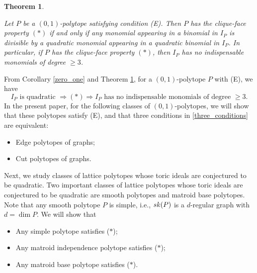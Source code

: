 \documentclass[10pt,a4paper]{amsart}
\newtheorem{thm}{Theorem} [section]
\numberwithin{thm}{section}
\numberwithin{equation}{section}
\begin{document}
\begin{thm}\label{indispensable}

Let \(P\) be a \((0,1)\)-polytope satisfying condition (E).
Then \(P\) has the clique-face property \((*)\) if and only if
any monomial appearing in a binomial in \(I_P\) is divisible by
a quadratic monomial appearing in a quadratic binomial in \(I_P\).
In particular, if \(P\) has the clique-face property \((*)\), then
\(I_P\) has no indispensable monomials of degree \(\ge 3\).
\end{thm}

From Corollary \ref{zero_one} and Theorem \ref{indispensable}, for a $(0,1)$-polytope $P$ with (E), we have 
\begin{equation} \label{three_conditions}
    I_P \mbox{ is quadratic } \Rightarrow
(*)
\Rightarrow
I_P \mbox{ has no indispensable monomials of degree } \ge 3.  
\end{equation}
In the present paper,
for the following classes of $(0,1)$-polytopes,
we will show that 
these polytopes satisfy (E), and that
three conditions in \eqref{three_conditions} are equivalent:
\begin{itemize}
    \item 
    Edge polytopes of graphs;

    \item 
    Cut polytopes of graphs.
   
\end{itemize}
Next, we study classes of lattice polytopes whose toric ideals are conjectured to be quadratic.
Two important classes of lattice polytopes whose toric ideals are conjectured to be quadratic are smooth polytopes and matroid base polytopes.
Note that any smooth polytope $P$ is simple, i.e., 
${\rm sk}(P)$ is a $d$-regular graph with $d = \dim P$.
We will show that
\begin{itemize}
    \item 
    Any simple polytope satisfies ($*$);

    \item 
    Any matroid independence polytope satisfies ($*$);

        \item 
    Any matroid base polytope satisfies ($*$).
\end{itemize}
\end{document}
